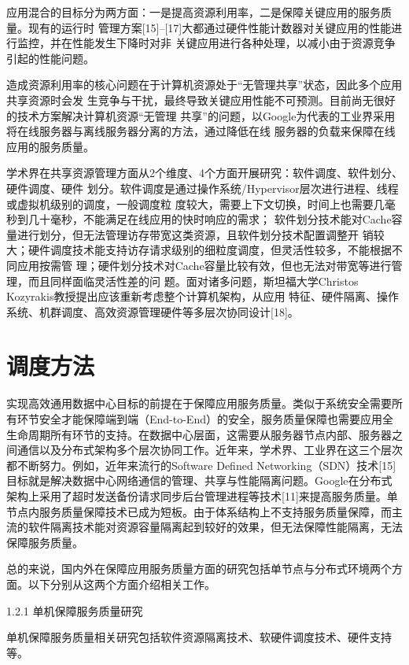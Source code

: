 应用混合的目标分为两方面：一是提高资源利用率，二是保障关键应用的服务质量。现有的运行时
管理方案[15]–[17]大都通过硬件性能计数器对关键应用的性能进行监控，并在性能发生下降时对非
关键应用进行各种处理，以减小由于资源竞争引起的性能问题。

造成资源利用率的核心问题在于计算机资源处于“无管理共享”状态，因此多个应用共享资源时会发
生竞争与干扰，最终导致关键应用性能不可预测。目前尚无很好的技术方案解决计算机资源“无管理
共享”的问题，以Google为代表的工业界采用将在线服务器与离线服务器分离的方法，通过降低在线
服务器的负载来保障在线应用的服务质量。

学术界在共享资源管理方面从2个维度、4个方面开展研究：软件调度、软件划分、硬件调度、硬件
划分。软件调度是通过操作系统/Hypervisor层次进行进程、线程或虚拟机级别的调度，一般调度粒
度较大，需要上下文切换，时间上也需要几毫秒到几十毫秒，不能满足在线应用的快时响应的需求；
软件划分技术能对Cache容量进行划分，但无法管理访存带宽这类资源，且软件划分技术配置调整开
销较大；硬件调度技术能支持访存请求级别的细粒度调度，但灵活性较多，不能根据不同应用按需管
理；硬件划分技术对Cache容量比较有效，但也无法对带宽等进行管理，而且同样面临灵活性差的问
题。面对诸多问题，斯坦福大学Christos Kozyrakis教授提出应该重新考虑整个计算机架构，从应用
特征、硬件隔离、操作系统、机群调度、高效资源管理硬件等多层次协同设计[18]。

\section{调度方法}
\label{sec:other}

实现高效通用数据中心目标的前提在于保障应用服务质量。类似于系统安全需要所有环节安全才能保障端到端（End-to-End）的安全，服务质量保障也需要应用全生命周期所有环节的支持。在数据中心层面，这需要从服务器节点内部、服务器之间通信以及分布式架构多个层次协同工作。近年来，学术界、工业界在这三个层次都不断努力。例如，近年来流行的Software Defined Networking（SDN）技术[15]目标就是解决数据中心网络通信的管理、共享与性能隔离问题。Google在分布式架构上采用了超时发送备份请求同步后台管理进程等技术[11]来提高服务质量。单节点内服务质量保障技术已成为短板。由于体系结构上不支持服务质量保障，而主流的软件隔离技术能对资源容量隔离起到较好的效果，但无法保障性能隔离，无法保障服务质量。

总的来说，国内外在保障应用服务质量方面的研究包括单节点与分布式环境两个方面。以下分别从这两个方面介绍相关工作。

1.2.1 单机保障服务质量研究

单机保障服务质量相关研究包括软件资源隔离技术、软硬件调度技术、硬件支持等。

